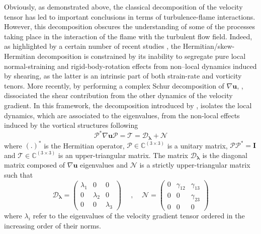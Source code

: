 Obviously, as demonstrated above, the classical decomposition of the velocity tensor has led
to important conclusions in terms of turbulence-flame interactions.
%
However, this decomposition obscures the understanding of some of the processes taking place in the
interaction of the flame with the turbulent flow field.
%
Indeed, as highlighted by a certain number of recent studies \cite{kolavr2007vortex,gao2019rortex,nagata2020triple}, the Hermitian/skew-Hermitian decomposition is constrained by its inability
to segregate pure local normal-straining and rigid-body-rotation effects from non--local dynamics
induced by shearing, as the latter is an intrinsic part of both strain-rate and vorticity tenors.
%
More recently, by performing a complex Schur decomposition of $\nabla \mathbf{u}$,
\citet{keylock2018schur}, dissociated the shear contribution from the other dynamics of the 
velocity gradient.
%
In this framework, the decomposition introduced by \citet{keylock2018schur}, isolates the local
dynamics, which are associated to the eigenvalues, from the non-local effects induced by the vortical
structures following
%
\begin{equation}
\boldsymbol{\mathcal{P}}^* \nabla \mathbf{u} \boldsymbol{\mathcal{P}} =  \mathcal{T} 
            = \boldsymbol{\mathcal{D}_{\lambda}}  +  \boldsymbol{\mathcal{N}}
\label{eq:complex_schur}
\end{equation} 
%
where $(.)^*$ is the Hermitian operator, $\boldsymbol{\mathcal{P}} \in \mathbb{C}^{(3\times3)}$ is a unitary
matrix, \ie $\boldsymbol{\mathcal{P}\mathcal{P}}^*=\mathbf{I}$ and $\boldsymbol{\mathcal{T}} \in \mathbb{C}^{(3\times3)}$ is an upper-triangular matrix.
%
The matrix $\boldsymbol{\mathcal{D}_{\lambda}}$ is the diagonal matrix composed of $\nabla \mathbf{u}$ eigenvalues and $\boldsymbol{\mathcal{N}}$ is a strictly upper-triangular matrix such that
%
\begin{equation}
\boldsymbol{\mathcal{D}_{\lambda}} =   
\begin{pmatrix}
\lambda_1 & 0 & 0\\ 
0         & \lambda_2    & 0\\
0         & 0            & \lambda_3
\end{pmatrix}
%
~~~~~~,~~~~~
\boldsymbol{\mathcal{N}} = \begin{pmatrix}
0 & \gamma_{12} & \gamma_{13}\\ 
0         & 0    & \gamma_{23}\\
0         & 0            & 0
\end{pmatrix}
\end{equation}
where $\lambda_i$ refer to the eigenvalues of the velocity gradient tensor ordered in the 
increasing order of their norms.


